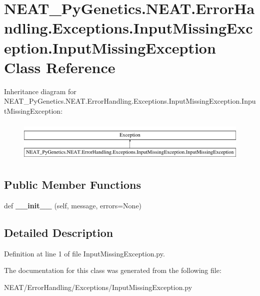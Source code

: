 \hypertarget{class_n_e_a_t___py_genetics_1_1_n_e_a_t_1_1_error_handling_1_1_exceptions_1_1_input_missing_exce0434cd2f533c4f8b0f57070fd8d9df81}{}\section{N\+E\+A\+T\+\_\+\+Py\+Genetics.\+N\+E\+A\+T.\+Error\+Handling.\+Exceptions.\+Input\+Missing\+Exception.\+Input\+Missing\+Exception Class Reference}
\label{class_n_e_a_t___py_genetics_1_1_n_e_a_t_1_1_error_handling_1_1_exceptions_1_1_input_missing_exce0434cd2f533c4f8b0f57070fd8d9df81}
Inheritance diagram for N\+E\+A\+T\+\_\+\+Py\+Genetics.\+N\+E\+A\+T.\+Error\+Handling.\+Exceptions.\+Input\+Missing\+Exception.\+Input\+Missing\+Exception\+:\begin{figure}[H]
\begin{center}
\leavevmode
\includegraphics[height=1.971831cm]{class_n_e_a_t___py_genetics_1_1_n_e_a_t_1_1_error_handling_1_1_exceptions_1_1_input_missing_exce0434cd2f533c4f8b0f57070fd8d9df81}
\end{center}
\end{figure}
\subsection*{Public Member Functions}
\begin{DoxyCompactItemize}
\item 
def {\bfseries \+\_\+\+\_\+init\+\_\+\+\_\+} (self, message, errors=None)\hypertarget{class_n_e_a_t___py_genetics_1_1_n_e_a_t_1_1_error_handling_1_1_exceptions_1_1_input_missing_exce0434cd2f533c4f8b0f57070fd8d9df81_ad099b1a8bf35220cc7d2a47d4469d749}{}\label{class_n_e_a_t___py_genetics_1_1_n_e_a_t_1_1_error_handling_1_1_exceptions_1_1_input_missing_exce0434cd2f533c4f8b0f57070fd8d9df81_ad099b1a8bf35220cc7d2a47d4469d749}

\end{DoxyCompactItemize}


\subsection{Detailed Description}


Definition at line 1 of file Input\+Missing\+Exception.\+py.



The documentation for this class was generated from the following file\+:\begin{DoxyCompactItemize}
\item 
N\+E\+A\+T/\+Error\+Handling/\+Exceptions/Input\+Missing\+Exception.\+py\end{DoxyCompactItemize}
